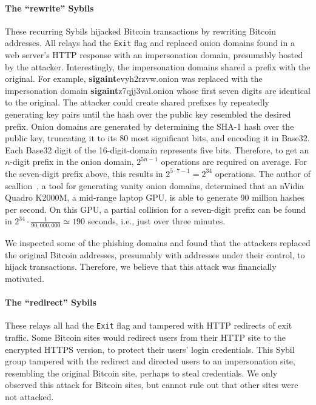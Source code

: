 \paragraph{The ``rewrite'' Sybils}
These recurring Sybils hijacked Bitcoin transactions by rewriting Bitcoin
addresses.  All relays had the \texttt{Exit} flag and replaced onion domains
found in a web server's HTTP response with an impersonation domain, presumably
hosted by the attacker.  Interestingly, the impersonation domains shared a
prefix with the original.  For example, \textbf{sigaint}evyh2rzvw.onion was
replaced with the impersonation domain \textbf{sigaint}z7qjj3val.onion whose
first seven digits are identical to the original.  The attacker could create
shared prefixes by repeatedly generating key pairs until the hash over the
public key resembled the desired prefix.  Onion domains are generated by
determining the SHA-1 hash over the public key, truncating it to its 80 most
significant bits, and encoding it in Base32.  Each Base32 digit of the
16-digit-domain represents five bits.  Therefore, to get an $n$-digit prefix in
the onion domain, $2^{5 n - 1}$ operations are required on average.  For the
seven-digit prefix above, this results in $2^{5 \cdot 7 - 1} = 2^{34}$
operations.  The author of scallion~\cite{scallion}, a tool for generating
vanity onion domains, determined that an nVidia Quadro K2000M, a mid-range
laptop GPU, is able to generate 90 million hashes per second.  On this GPU, a
partial collision for a seven-digit prefix can be found in $2^{34} \cdot
\frac{1}{90,000,000} \simeq 190$ seconds, i.e., just over three minutes.

We inspected some of the phishing domains and found that the attackers replaced
the original Bitcoin addresses, presumably with addresses under their control,
to hijack transactions.  Therefore, we believe that this attack was financially
motivated.

\paragraph{The ``redirect'' Sybils}
These relays all had the \texttt{Exit} flag and tampered with HTTP redirects of
exit traffic.  Some Bitcoin sites would redirect users from their HTTP site to
the encrypted HTTPS version, to protect their users' login credentials.  This
Sybil group tampered with the redirect and directed users to an impersonation
site, resembling the original Bitcoin site, perhaps to steal credentials.  We
only observed this attack for Bitcoin sites, but cannot rule out that other
sites were not attacked.


